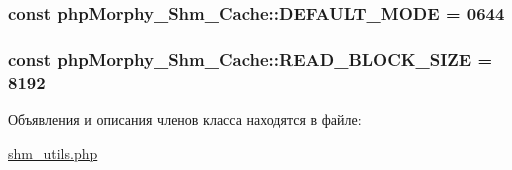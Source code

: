 \label{classphpMorphy__Shm__Cache_a5ca640d70ffce9040ca5bd31cf1106ee}
\hypertarget{classphpMorphy__Shm__Cache_a96b6b32f41985d19129943700b43da2d}{
\subsubsection[{DEFAULT\_\-MODE}]{\setlength{\rightskip}{0pt plus 5cm}const {\bf phpMorphy\_\-Shm\_\-Cache::DEFAULT\_\-MODE} = 0644}}
\label{classphpMorphy__Shm__Cache_a96b6b32f41985d19129943700b43da2d}
\hypertarget{classphpMorphy__Shm__Cache_a770972d5d9c31a0148a161d3b5a4a70d}{
\subsubsection[{READ\_\-BLOCK\_\-SIZE}]{\setlength{\rightskip}{0pt plus 5cm}const {\bf phpMorphy\_\-Shm\_\-Cache::READ\_\-BLOCK\_\-SIZE} = 8192}}
\label{classphpMorphy__Shm__Cache_a770972d5d9c31a0148a161d3b5a4a70d}


Объявления и описания членов класса находятся в файле:\begin{DoxyCompactItemize}
\item 
\hyperlink{shm__utils_8php}{shm\_\-utils.php}\end{DoxyCompactItemize}
